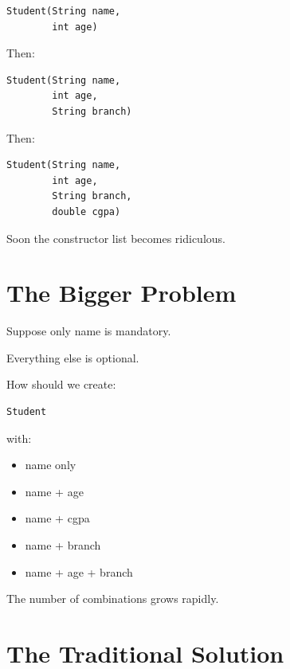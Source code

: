 \documentclass[11pt,a4paper]{book}
\begin{document}
\begin{verbatim}
Student(String name,
        int age)
\end{verbatim}

Then:

\begin{verbatim}
Student(String name,
        int age,
        String branch)
\end{verbatim}

Then:

\begin{verbatim}
Student(String name,
        int age,
        String branch,
        double cgpa)
\end{verbatim}

Soon the constructor list becomes ridiculous.


\section{The Bigger Problem}

Suppose only name is mandatory.

Everything else is optional.

How should we create:

\begin{verbatim}
Student
\end{verbatim}

with:

\begin{itemize}

\item name only

\item name + age

\item name + cgpa

\item name + branch

\item name + age + branch

\end{itemize}

The number of combinations grows rapidly.


\section{The Traditional Solution}
\end{document}

